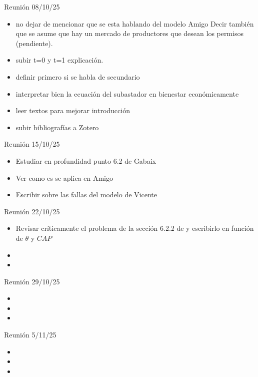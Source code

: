 Reunión 08/10/25
\begin{itemize}
\item no dejar de mencionar que se esta hablando del modelo Amigo Decir también que se asume que hay un mercado de productores que desean los permisos (pendiente). 
\item subir t=0 y t=1 explicación.
\item definir primero si se habla de secundario
\item interpretar bien la ecuación del subastador en bienestar económicamente
\item leer textos para mejorar introducción
\item subir bibliografías a Zotero 
\end{itemize}

Reunión 15/10/25
\begin{itemize}
\item Estudiar en profundidad punto 6.2 de Gabaix
\item Ver como es se aplica en Amigo
\item Escribir sobre las fallas del modelo de Vicente
\end{itemize}


Reunión 22/10/25
\begin{itemize}
\item Revisar críticamente el problema de la sección 6.2.2 de  y escribirlo en función de $\theta$ y $CAP$
\item 
\item 
\end{itemize}

Reunión 29/10/25
\begin{itemize}
\item 
\item 
\item 
\end{itemize}

Reunión 5/11/25
\begin{itemize}
\item 
\item 
\item 
\end{itemize}
